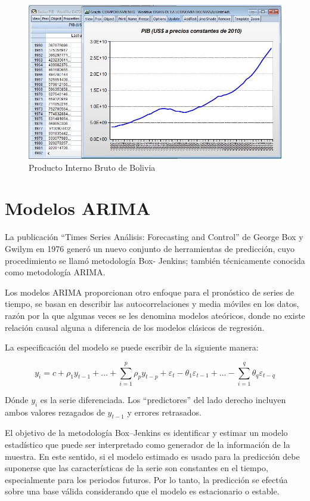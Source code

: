 \documentclass[
]{book}
\begin{document}
\begin{figure}

{\centering \includegraphics[width=0.8\linewidth]{imagenes/PIB} 

}

\caption{Producto Interno Bruto de Bolivia}\label{fig:unnamed-chunk-8}
\end{figure}

\hypertarget{modelos-arima}{%
\section{Modelos ARIMA}\label{modelos-arima}}

La publicación ``Times Series Análisis: Forecasting and Control'' de George Box y Gwilym en 1976 generó un nuevo conjunto de herramientas de predicción, cuyo procedimiento se llamó metodología Box- Jenkins; también técnicamente conocida como metodología ARIMA.

Los modelos ARIMA proporcionan otro enfoque para el pronóstico de series de tiempo, se basan en describir las autocorrelaciones y media móviles en los datos, razón por la que algunas veces se les denomina modelos ateóricos, donde no existe relación causal alguna a diferencia de los modelos clásicos de regresión.

La especificación del modelo se puede escribir de la siguiente manera:

\[ y_i = c + \rho_1 y_{t-1}+\dots + \sum_{i=1}^{p}\rho_p y_{t-p}+ \varepsilon_t - \theta_1 \varepsilon_{t-1}+\dots- \sum_{i=1}^{q}\theta_q \varepsilon _{t-q}\]

Dónde \(y_i\) es la serie diferenciada. Los ``predictores'' del lado derecho incluyen ambos valores rezagados de \(y_{t-1}\) y errores retrasados.

El objetivo de la metodología Box--Jenkins es identificar y estimar un modelo estadístico que puede ser interpretado como generador de la información de la muestra. En este sentido, si el modelo estimado es usado para la predicción debe suponerse que las características de la serie son constantes en el tiempo, especialmente para los periodos futuros. Por lo tanto, la predicción se efectúa sobre una base válida considerando que el modelo es estacionario o estable.
\end{document}
